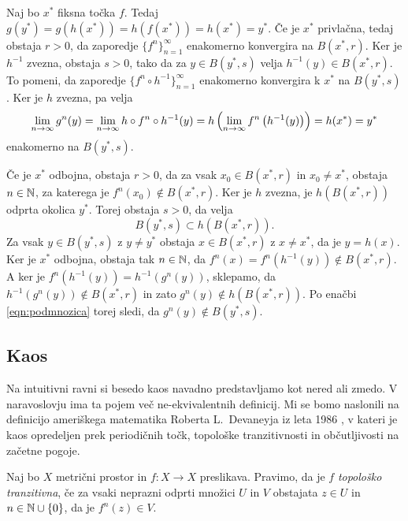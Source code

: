 \begin{dokaz}
    Naj bo \(x^*\) fiksna točka \(f\). Tedaj \(g (y^*) = g (h (x^*)) = h (f (x^*)) = h (x^*) = y^*\). Če je \(x^*\) privlačna, tedaj obstaja \(r > 0\), da zaporedje \(\{f^n\}_{n=1}^\infty\) enakomerno konvergira na \(B (x^*, r)\). Ker je \(h^{-1}\) zvezna, obstaja \(s > 0\), tako da za \(y \in B (y^*, s)\) velja \(h^{-1} (y) \in B (x^*, r)\). To pomeni, da zaporedje \(\{f^n \circ h^{-1}\}_{n=1}^\infty\) enakomerno konvergira k \(x^*\) na \(B (y^*, s)\). Ker je \(h\) zvezna, pa velja
    \[\lim_{n \to \infty} g^n (y) = \lim_{n \to \infty} h \circ f^n \circ h^{-1} (y) = h \left( \lim_{n \to \infty} f^n \left( h^{-1} (y) \right) \right) = h (x^*) = y^*\]
    enakomerno na \(B (y^*, s)\).

    Če je \(x^*\) odbojna, obstaja \(r > 0\), da za vsak \(x_0 \in B (x^*, r)\) in \(x_0 \neq x^*\), obstaja \(n \in \mathbb N\), za katerega je \(f^n (x_0) \notin B (x^*, r)\). Ker je \(h\) zvezna, je \(h (B (x^*, r))\) odprta okolica \(y^*\). Torej obstaja \(s > 0\), da velja
    \begin{equation} \label{eqn:podmnozica}
        B (y^*, s) \subset h (B (x^*, r)).
    \end{equation}
    Za vsak \(y \in B (y^*, s)\) z \(y \neq y^*\) obstaja \(x \in B (x^*, r)\) z \(x \neq x^*\), da je \(y = h (x)\). Ker je \(x^*\) odbojna, obstaja tak \(n \in \mathbb N\), da \(f^n (x) = f^n (h^{-1} (y)) \notin B (x^*, r)\). A ker je \(f^n (h^{-1} (y)) = h^{-1} (g^n (y))\), sklepamo, da \(h^{-1} (g^n (y)) \notin B (x^*, r)\) in zato \(g^n (y) \notin h (B (x^*, r))\). Po enačbi \eqref{eqn:podmnozica} torej sledi, da \(g^n (y) \notin B (y^*, s)\).
\end{dokaz}

\subsection{Kaos}

Na intuitivni ravni si besedo kaos navadno predstavljamo kot nered ali zmedo. V naravoslovju ima ta pojem več ne-ekvivalentnih definicij. Mi se bomo naslonili na definicijo ameriškega matematika Roberta L.~Devaneyja iz leta \num{1986} \cite{Devaney_1986}, v kateri je kaos opredeljen prek periodičnih točk, topološke tranzitivnosti in občutljivosti na začetne pogoje.

\begin{definicija}
    Naj bo \(X\) metrični prostor in \(f \colon X \to X\) preslikava. Pravimo, da je \(f\) \emph{topološko tranzitivna}, če za vsaki neprazni odprti množici \(U\) in \(V\) obstajata \(z \in U\) in \(n \in \mathbb N \cup \left\{ 0 \right\}\), da je \(f^n (z) \in V\).
\end{definicija}

